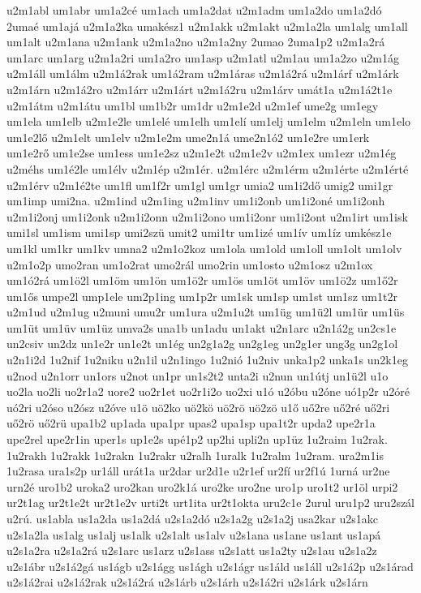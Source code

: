 {u2m1abl
um1abr
um1a2cé
um1ach
um1a2dat
u2m1adm
um1a2do
um1a2dó
2umaé
um1ajá
u2m1a2ka
umakész1
u2m1akk
u2m1akt
u2m1a2la
um1alg
um1all
um1alt
u2m1ana
u2m1ank
u2m1a2no
u2m1a2ny
2umao
2uma1p2
u2m1a2rá
um1arc
um1arg
u2m1a2ri
um1a2ro
um1asp
u2m1atl
u2m1au
um1a2zo
u2m1ág
u2m1áll
um1álm
u2m1á2rak
um1á2ram
u2m1áras
u2m1á2rá
u2m1árf
u2m1árk
u2m1árn
u2m1á2ro
u2m1árr
u2m1árt
u2m1á2ru
u2m1árv
umát1a
u2m1á2t1e
u2m1átm
u2m1átu
um1bl
um1b2r
um1dr
u2m1e2d
u2m1ef
ume2g
um1egy
um1ela
um1elb
u2m1e2le
um1elé
um1elh
um1elí
um1elj
um1elm
u2m1eln
um1elo
um1e2lő
u2m1elt
um1elv
u2m1e2m
ume2n1á
ume2n1ó2
um1e2re
um1erk
um1e2rő
um1e2se
um1ess
um1e2sz
u2m1e2t
u2m1e2v
u2m1ex
um1ezr
u2m1ég
u2méhs
um1é2le
um1élv
u2m1ép
u2m1ér.
u2m1érc
u2m1érm
u2m1érte
u2m1érté
u2m1érv
u2m1é2te
um1fl
um1f2r
um1gl
um1gr
umia2
um1i2dő
umig2
umi1gr
um1imp
umi2na.
u2m1ind
u2m1ing
u2m1inv
um1i2onb
um1i2oné
um1i2onh
u2m1i2onj
um1i2onk
u2m1i2onn
u2m1i2ono
um1i2onr
um1i2ont
u2m1irt
um1isk
umi1sl
um1ism
umi1sp
umi2szü
umit2
umi1tr
um1izé
um1ív
um1íz
umkész1e
um1kl
um1kr
um1kv
umna2
u2m1o2koz
um1ola
um1old
um1oll
um1olt
um1olv
u2m1o2p
umo2ran
um1o2rat
umo2rál
umo2rin
um1osto
u2m1osz
u2m1ox
um1ó2rá
um1ö2l
um1öm
um1ön
um1ö2r
um1ös
um1öt
um1öv
um1ö2z
um1ő2r
um1ős
umpe2l
ump1ele
um2p1ing
um1p2r
um1sk
um1sp
um1st
um1sz
um1t2r
u2m1ud
u2m1ug
u2muni
umu2r
um1ura
u2m1u2t
um1üg
um1ü2l
um1ür
um1üs
um1üt
um1üv
um1üz
umva2s
una1b
un1adu
un1akt
u2n1arc
u2n1á2g
un2cs1e
un2csiv
un2dz
un1e2r
un1e2t
un1ég
un2g1a2g
un2g1eg
un2g1er
ung3g
un2g1ol
u2n1i2d
1u2nif
1u2niku
u2n1il
u2n1ingo
1u2nió
1u2niv
unka1p2
unka1s
un2k1eg
u2nod
u2n1orr
un1ors
u2not
un1pr
un1s2t2
unta2i
u2nun
un1útj
un1ü2l
u1o
uo2la
uo2li
uo2r1a2
uore2
uo2r1et
uo2r1i2o
uo2xi
u1ó
u2óbu
u2óne
uó1p2r
u2óré
uó2ri
u2óso
u2ósz
u2óve
u1ö
uö2ko
uö2kö
uö2rö
uö2zö
u1ő
uő2re
uő2ré
uő2ri
uő2rö
uő2rü
upa1b2
up1ada
upa1pr
upas2
upa1sp
upa1t2r
upda2
upe2r1a
upe2rel
upe2r1in
uper1s
up1e2s
upé1p2
up2hi
upli2n
up1üz
1u2raim
1u2rak.
1u2rakh
1u2rakk
1u2rakn
1u2rakr
u2ralh
1uralk
1u2ralm
1u2ram.
ura2m1is
1u2rasa
ura1s2p
ur1áll
urát1a
ur2dar
ur2d1e
u2r1ef
ur2fí
ur2f1ú
1urná
ur2ne
urn2é
uro1b2
uroka2
uro2kan
uro2k1á
uro2ke
uro2ne
uro1p
uro1t2
ur1öl
urpi2
ur2t1ag
ur2t1e2t
ur2t1e2v
urti2t
urt1ita
ur2t1okta
uru2c1e
2urul
uru1p2
uru2szál
u2rú.
us1abla
us1a2da
us1a2dá
u2s1a2dó
u2s1a2g
u2s1a2j
usa2kar
u2s1akc
u2s1a2la
us1alg
us1alj
us1alk
u2s1alt
us1alv
u2s1ana
us1ane
us1ant
us1apá
u2s1a2ra
u2s1a2rá
u2s1arc
us1arz
u2s1ass
u2s1att
us1a2ty
u2s1au
u2s1a2z
u2s1ábr
u2s1á2gá
us1ágb
u2s1ágg
us1ágh
u2s1ágr
us1áld
us1áll
u2s1á2p
u2s1árad
u2s1á2rai
u2s1á2rak
u2s1á2rá
u2s1árb
u2s1árh
u2s1á2ri
u2s1árk
u2s1árn
}
